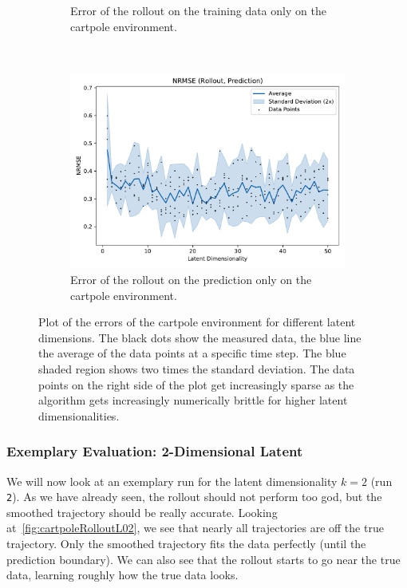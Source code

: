 \begin{figure}
\begin{subfigure}{0.5\linewidth}
					\caption[Error of the training rollout on the cartpole environment]{Error of the rollout on the training data only on the cartpole environment.}
					\label{fig:cartpoleRmseTrain}
				\end{subfigure}%
				~
				\begin{subfigure}{0.5\linewidth}
					\centering
					\includegraphics[width=\linewidth]{figures/results/cartpole-gym/latent-dim/comparison-rmse-rollout-prediction-normalized-mean-vs-latent-dim.pdf}
					\caption[Error of the prediction rollout on the cartpole environment]{Error of the rollout on the prediction only on the cartpole environment.}
					\label{fig:cartpoleRmsePred}
				\end{subfigure}
				\caption[Errors on the cartpole environment for different latent dimensions]{Plot of the errors of the cartpole environment for different latent dimensions. The black dots show the measured data, the blue line the average of the data points at a specific time step. The blue shaded region shows two times the standard deviation. The data points on the right side of the plot get increasingly sparse as the algorithm gets increasingly numerically brittle for higher latent dimensionalities.}
				\label{fig:cartpoleRmse}
			\end{figure}

		\subsubsection{Exemplary Evaluation: 2-Dimensional Latent}
			We will now look at an exemplary run for the latent dimensionality \( k = 2 \) (run \texttt{2}). As we have already seen, the rollout should not perform too god, but the smoothed trajectory should be really accurate. Looking at~\autoref{fig:cartpoleRolloutL02}, we see that nearly all trajectories are off the true trajectory. Only the smoothed trajectory fits the data perfectly (until the prediction boundary). We can also see that the rollout starts to go near the true data, learning roughly how the true data looks.

